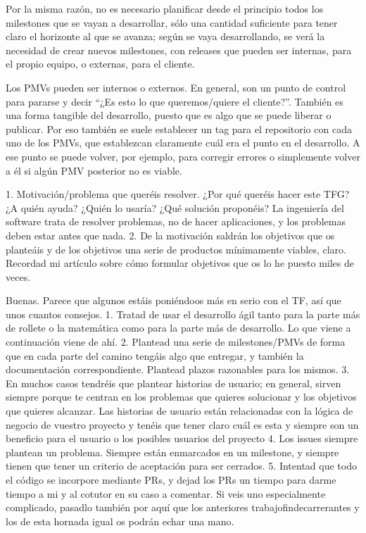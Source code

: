 Por la misma razón, no es necesario planificar desde el 
principio todos los milestones que se vayan a desarrollar, 
sólo una cantidad suficiente para tener claro el horizonte 
al que se avanza; según se vaya desarrollando, se verá la 
necesidad de crear nuevos milestones, con releases que 
pueden ser internas, para el propio equipo, o externas, para el cliente.

Los PMVs pueden ser internos o externos. En general, 
son un punto de control para pararse y decir 
“¿Es esto lo que queremos/quiere el cliente?”. 
También es una forma tangible del desarrollo, puesto 
que es algo que se puede liberar o publicar. 
Por eso también se suele establecer un tag para 
el repositorio con cada uno de los PMVs, que 
establezcan claramente cuál era el punto en el 
desarrollo. A ese punto se puede volver, por ejemplo, 
para corregir errores o simplemente volver a él si algún 
PMV posterior no es viable.

1. Motivación/problema que queréis resolver. ¿Por qué queréis 
hacer este TFG? ¿A quién ayuda? ¿Quién lo usaría? 
¿Qué solución proponéis? La ingeniería del software 
trata de resolver problemas, no de hacer aplicaciones, 
y los problemas deben estar antes que nada.
2. De la motivación saldrán los objetivos que os planteáis 
y de los objetivos una serie de productos mínimamente viables, claro. 
Recordad mi artículo sobre cómo formular objetivos que os lo 
he puesto miles de veces.

Buenas. Parece que algunos estáis poniéndoos más en serio con el TF, 
así que unos cuantos consejos.
1. Tratad de usar el desarrollo ágil tanto para la parte más de 
rollete o la matemática como para la parte más de desarrollo. 
Lo que viene a continuación viene de ahí.
2. Plantead una serie de milestones/PMVs de forma que en cada 
parte del camino tengáis algo que entregar, y también 
la documentación correspondiente. Plantead plazos razonables para los mismos.
3. En muchos casos tendréis que plantear historias de 
usuario; en general, sirven siempre porque te centran 
en los problemas que quieres solucionar y los objetivos 
que quieres alcanzar. Las historias de usuario están 
relacionadas con la lógica de negocio de vuestro proyecto 
y tenéis que tener claro cuál es esta y siempre son un 
beneficio para el usuario o los posibles usuarios del proyecto
4. Los issues siempre plantean un problema. Siempre están 
enmarcados en un milestone, y siempre tienen que tener un 
criterio de aceptación para ser cerrados. 
5. Intentad que todo el código se incorpore mediante PRs, 
y dejad los PRs un tiempo para darme tiempo a mi y al cotutor en su caso 
a comentar. Si veis uno especialmente complicado, pasadlo 
también por aquí que los anteriores trabajofindecarrerantes 
y los de esta hornada igual os podrán echar una mano.

